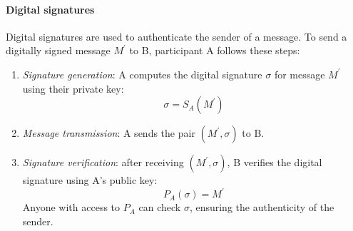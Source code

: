 \paragraph*{Digital signatures}
Digital signatures are used to authenticate the sender of a message. 
To send a digitally signed message $M^\prime$ to B, participant A follows these steps: 
\begin{enumerate}
    \item \textit{Signature generation}: A computes the digital signature $\sigma$ for message $M^\prime$ using their private key: 
        \[\sigma=S_A(M^\prime)\]
    \item \textit{Message transmission}: A sends the pair $(M^\prime,\sigma)$ to B. 
    \item \textit{Signature verification}: after receiving $(M^\prime,\sigma)$, B verifies the digital signature using A's public key:
        \[P_A(\sigma)=M^\prime\]
        Anyone with access to $P_A$ can check $\sigma$, ensuring the authenticity of the sender. 
\end{enumerate}


